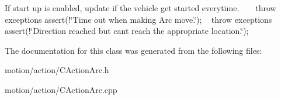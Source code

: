 If start up is enabled, update if the vehicle get started everytime. ~\newline
~\newline
 throw exceptions assert(!\char`\"{}\+Time out when making Arc move.\char`\"{}); ~\newline
 throw exceptions assert(!\char`\"{}\+Direction reached but can\textquotesingle{}t reach the appropriate location.\char`\"{}); 

The documentation for this class was generated from the following files\+:\begin{DoxyCompactItemize}
\item 
motion/action/C\+Action\+Arc.\+h\item 
motion/action/C\+Action\+Arc.\+cpp\end{DoxyCompactItemize}
